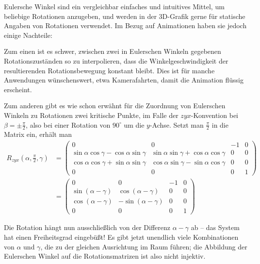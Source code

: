 Eulersche Winkel sind ein vergleichbar einfaches und intuitives Mittel, um beliebige Rotationen anzugeben, und werden in der 3D-Grafik gerne für statische Angaben von Rotationen verwendet. Im Bezug auf Animationen haben sie jedoch einige Nachteile:

Zum einen ist es schwer, zwischen zwei in Eulerschen Winkeln gegebenen Rotationszuständen so zu interpolieren, dass die Winkelgeschwindigkeit der resultierenden Rotationsbewegung konstant bleibt. Dies ist für manche Anwendungen wünschenswert, etwa Kamerafahrten, damit die Animation flüssig erscheint.

Zum anderen gibt es wie schon erwähnt für die Zuordnung von Eulerschen Winkeln zu Rotationen zwei kritische Punkte, im Falle der $zyx$-Konvention bei $\beta = \pm \frac{\pi}{2}$, also bei einer Rotation von $90^\circ$ um die $y$-Achse. Setzt man $\frac{\pi}{2}$ in die Matrix ein, erhält man
\begin{equation}
\begin{split}
 R_{zyx}{\left(\alpha, \frac{\pi}{2}, \gamma \right)}
 & = 
 \begin{pmatrix}
  0 & 0 & -1 & 0 \\
  \sin \alpha \cos \gamma - \cos \alpha \sin \gamma & \sin \alpha \sin \gamma + \cos \alpha \cos \gamma & 0 & 0 \\
  \cos \alpha \cos \gamma + \sin \alpha \sin \gamma & \cos \alpha \sin \gamma - \sin \alpha \cos \gamma & 0 & 0 \\
  0 & 0 & 0 & 1
 \end{pmatrix} \\
 & = 
 \begin{pmatrix}
  0 & 0 & -1 & 0 \\
  \sin ( \alpha - \gamma ) &  \cos ( \alpha - \gamma ) & 0 & 0 \\
  \cos ( \alpha - \gamma ) & -\sin ( \alpha - \gamma ) & 0 & 0 \\
  0 & 0 & 0 & 1
 \end{pmatrix}
\end{split}
\end{equation}

Die Rotation hängt nun ausschließlich von der Differenz $\alpha - \gamma$ ab -- das System hat einen Freiheitsgrad eingebüßt! Es gibt jetzt unendlich viele Kombinationen von $\alpha$ und $\gamma$, die zu der gleichen Ausrichtung im Raum führen; die Abbildung der Eulerschen Winkel auf die Rotationsmatrizen ist also nicht injektiv.


